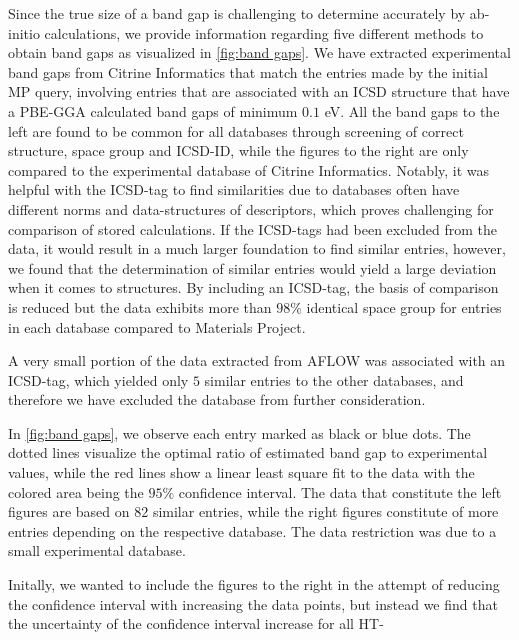 Since the true size of a band gap is challenging to determine accurately by ab-initio calculations, we provide information regarding five different methods to obtain band gaps as visualized in \autoref{fig:band gaps}. We have extracted experimental band gaps from Citrine Informatics that match the entries made by the initial MP query, involving entries that are associated with an ICSD structure that have a PBE-GGA calculated band gaps of minimum $0.1$ eV.
All the band gaps to the left are found to be common for all databases through screening of correct structure, space group and ICSD-ID, while the figures to the right are only compared to the experimental database of Citrine Informatics.
Notably, it was helpful with the ICSD-tag to find similarities due to databases often have different norms and data-structures of descriptors, which proves challenging for comparison of stored calculations.
If the ICSD-tags had been excluded from the data, it would result in a much larger foundation to find similar entries, however, we found that the determination of similar entries would yield a large deviation when it comes to structures. By including an ICSD-tag, the basis of comparison is reduced but the data exhibits more than $98\%$ identical space group for entries in each database compared to Materials Project.

A very small portion of the data extracted from AFLOW was associated with an ICSD-tag, which yielded only $5$ similar entries to the other databases, and therefore we have excluded the database from further consideration.

In \autoref{fig:band gaps}, we observe each entry marked as black or blue dots. The dotted lines visualize the optimal ratio of estimated band gap to experimental values, while the red lines show a linear least square fit to the data with the colored area being the $95\%$ confidence interval. The data that constitute the left figures are based on $82$ similar entries, while the right figures constitute of more entries depending on the respective database. The data restriction was due to a small experimental database.

Initally, we wanted to include the figures to the right in the attempt of reducing the confidence interval with increasing the data points, but instead we find that the uncertainty of the confidence interval increase for all HT-



